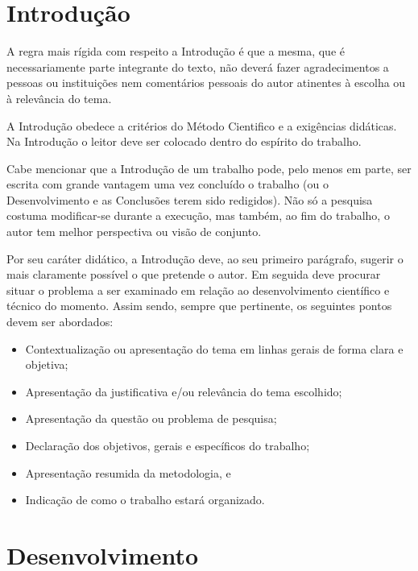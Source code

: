 


\section{Introdução}

A regra mais rígida com respeito a Introdução é que a mesma, que é 
necessariamente parte integrante do texto, não deverá fazer agradecimentos 
a pessoas ou instituições nem comentários pessoais do autor atinentes à 
escolha ou à relevância do tema.

A Introdução obedece a critérios do Método Cientifico e a exigências 
didáticas. Na Introdução o leitor deve ser colocado dentro do espírito do 
trabalho.

Cabe mencionar que a Introdução de um trabalho pode, pelo menos em parte, 
ser escrita com grande vantagem uma vez concluído o trabalho (ou o 
Desenvolvimento e as Conclusões terem sido redigidos). Não só a pesquisa 
costuma modificar-se durante a execução, mas também, ao fim do trabalho, o 
autor tem melhor perspectiva ou visão de conjunto.

Por seu caráter didático, a Introdução deve, ao seu primeiro parágrafo, 
sugerir o mais claramente possível o que pretende o autor. Em seguida deve 
procurar situar o problema a ser examinado em relação ao desenvolvimento 
científico e técnico do momento. Assim sendo, sempre que pertinente, os 
seguintes pontos devem ser abordados: 

\begin{itemize}

	\item Contextualização ou apresentação do tema em linhas gerais de 
	forma clara e objetiva;
	\item Apresentação da justificativa e/ou relevância do tema escolhido;
	\item Apresentação da questão ou problema de pesquisa;
	\item Declaração dos objetivos, gerais e específicos do trabalho;
	\item Apresentação resumida da metodologia, e
	\item Indicação de como o trabalho estará organizado.

\end{itemize}

\section{Desenvolvimento}

